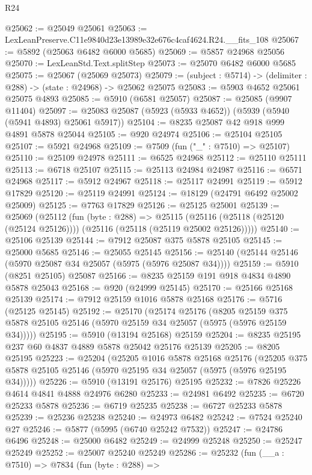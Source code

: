 \begin{lexlean}{R24}
\begin{coremodule}
@25062 := @25049 @25061
@25063 := LexLeanPreserve.C11e9840d23e13989e32e676c4caf4624.R24.__fits_108
@25067 := @5892 (@25063 @6482 @6000 @5685)
@25069 := @5857 @24968 @25056
@25070 := LexLeanStd.Text.splitStep
@25073 := @25070 @6482 @6000 @5685
@25075 := @25067 (@25069 @25073)
@25079 := (subject : @5714) -> (delimiter : @288) -> (state : @24968) -> @25062 @25075
@25083 := @5903 @4652 @25061 @25075 @4893
@25085 := @5910 (@6581 @25057)
@25087 := @25085 (@9907 @11404)
@25097 := @25083 @25087 (@5923 (@5933 @4652)) (@5939 (@5940 (@5941 @4893) @25061 @5917))
@25104 := @8235 @25087 @42 @918 @999 @4891 @5878 @25044
@25105 := @920 @24974
@25106 := @25104 @25105
@25107 := @5921 @24968
@25109 := @7509 (fun ("_" : @7510) => @25107)
@25110 := @25109 @24978
@25111 := @6525 @24968
@25112 := @25110 @25111
@25113 := @6718 @25107
@25115 := @25113 @24984 @24987
@25116 := @6571 @24968
@25117 := @5912 @24967
@25118 := @25117 @24991
@25119 := @5912 @17829
@25120 := @25119 @24991
@25124 := @18129 (@24791 @6492 @25002 @25009)
@25125 := @7763 @17829
@25126 := @25125 @25001
@25139 := @25069
    (@25112
      (fun (byte : @288) =>
      @25115 (@25116 (@25118 (@25120 (@25124 @25126)))) (@25116 (@25118 (@25119 @25002 @25126)))))
@25140 := @25106 @25139
@25144 := @7912 @25087 @375 @5878 @25105
@25145 := @25000 @5685
@25146 := @25055 @25145
@25156 := @25140 (@25144 @25146 (@5970 @25087 @34 @25057 (@5975 (@5976 @25087 @34))))
@25159 := @5910 (@8251 @25105) @25087
@25166 := @8235 @25159 @191 @918 @4834 @4890 @5878 @25043
@25168 := @920 (@24999 @25145)
@25170 := @25166 @25168 @25139
@25174 := @7912 @25159 @1016 @5878 @25168
@25176 := @5716 (@25125 @25145)
@25192 := @25170
    (@25174
      @25176
      (@8205 @25159 @375 @5878 @25105 @25146 (@5970 @25159 @34 @25057 (@5975 (@5976 @25159 @34)))))
@25195 := @5910 (@13194 @25168) @25159
@25204 := @8235 @25195 @237 @60 @4837 @4889 @5878 @25042 @25176 @25139
@25205 := @8205 @25195
@25223 := @25204
    (@25205
      @1016
      @5878
      @25168
      @25176
      (@25205 @375 @5878 @25105 @25146 (@5970 @25195 @34 @25057 (@5975 (@5976 @25195 @34)))))
@25226 := @5910 (@13191 @25176) @25195
@25232 := @7826 @25226 @4614 @4841 @4888 @24976 @6280
@25233 := @24981 @6492
@25235 := @6720 @25233 @5878
@25236 := @6719 @25235
@25238 := @6727 @25233 @5878
@25239 := @25236 @25238
@25240 := @24973 @6482
@25242 := @7524 @25240 @27
@25246 := @5877 (@5995 (@6740 @25242 @7532))
@25247 := @24786 @6496
@25248 := @25000 @6482
@25249 := @24999 @25248
@25250 := @25247 @25249
@25252 := @25007 @25240 @25249
@25286 := @25232
    (fun (__a : @7510) =>
    @7834
      (fun (byte : @288) =>

\end{coremodule}
\end{lexlean}
